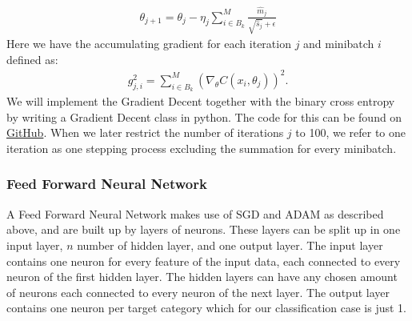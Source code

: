 \documentclass[11pt]{article}
\begin{document}
\begin{align*}
    \theta_{j+1} = \theta_j - \eta_j\sum_{i \in B_k}^M \frac{\hat{m}_j}{\sqrt{\hat{s}_j} + \epsilon }
\end{align*}
Here we have the accumulating gradient for each iteration $j$ and minibatch $i$ defined as:
\begin{align*}
    g_{j, i}^2 = \sum_{i \in B_k}^M(\nabla_\theta C(x_i, \theta_j))^2.
\end{align*}
We will implement the Gradient Decent together with the binary cross entropy by writing a Gradient Decent class in python. The code for this can be found on \href{https://github.com/Fslippe/FYS-STK4155/tree/main/project3}{GitHub}. When we later restrict the number of iterations $j$ to 100, we refer to one iteration as one stepping process excluding the summation for every minibatch.
\subsubsection*{Feed Forward Neural Network}
A Feed Forward Neural Network makes use of SGD and ADAM as described above, and are built up by layers of neurons. These layers can be split up in one input layer, $n$ number of hidden layer, and one output layer. The input layer contains one neuron for every feature of the input data, each connected to every neuron of the first hidden layer. The hidden layers can have any chosen amount of neurons each connected to every neuron of the next layer. The output layer contains one neuron per target category which for our classification case is just 1.
\end{document}
